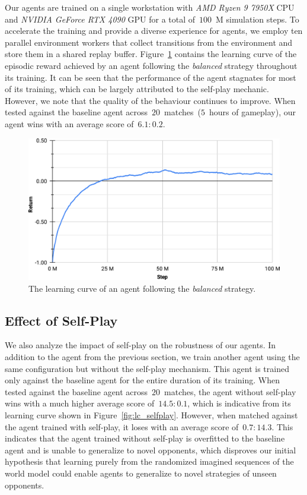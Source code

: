 \documentclass{article}
\begin{document}
Our agents are trained on a single workstation with \textit{AMD Ryzen 9 7950X} CPU and \textit{NVIDIA GeForce RTX 4090} GPU for a total of~\(100\)~M simulation steps. To accelerate the training and provide a diverse experience for agents, we employ ten parallel environment workers that collect transitions from the environment and store them in a shared replay buffer. Figure~\ref{fig:lc_balanced} contains the learning curve of the episodic reward achieved by an agent following the \textit{balanced} strategy throughout its training. It can be seen that the performance of the agent stagnates for most of its training, which can be largely attributed to the self-play mechanic. However, we note that the quality of the behaviour continues to improve. When tested against the baseline agent across~\(20\)~matches~(\(5\)~hours of gameplay), our agent wins with an average score of~\(6.1 : 0.2\).

\begin{figure}[ht]
    \centering
    \includegraphics[width=0.9\linewidth]{graphics/learning_curve_balanced.png}
    \caption{The learning curve of an agent following the \textit{balanced} strategy.}
    \label{fig:lc_balanced}
\end{figure}

\subsection{Effect of Self-Play}\label{ssec:effect-of-self-play}

We also analyze the impact of self-play on the robustness of our agents. In addition to the agent from the previous section, we train another agent using the same configuration but without the self-play mechanism. This agent is trained only against the baseline agent for the entire duration of its training. When tested against the baseline agent across~\(20\)~matches, the agent without self-play wins with a much higher average score of~\(14.5 : 0.1\), which is indicative from its learning curve shown in Figure~\ref{fig:lc_selfplay}. However, when matched against the agent trained with self-play, it loses with an average score of~\(0.7 : 14.3\). This indicates that the agent trained without self-play is overfitted to the baseline agent and is unable to generalize to novel opponents, which disproves our initial hypothesis that learning purely from the randomized imagined sequences of the world model could enable agents to generalize to novel strategies of unseen opponents.
\end{document}
